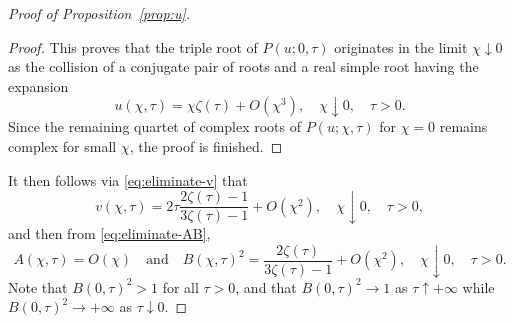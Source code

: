 \begin{proof}[Proof of Proposition~\ref{prop:u}]
\begin{proof}
This proves that the triple root of $P(u;0,\tau)$ originates in the limit $\chi\downarrow 0$ as the collision of a conjugate pair of roots and a real simple root having the expansion
\begin{equation}
u(\chi,\tau)=\chi \zeta(\tau)+O(\chi^3),\quad\chi\downarrow 0,\quad\tau>0.
\end{equation}
Since the remaining quartet of complex roots of $P(u;\chi,\tau)$ for $\chi=0$ remains complex for small $\chi$, the proof is finished.
\end{proof}
It then follows via \eqref{eq:eliminate-v}
that 
\begin{equation}
v(\chi,\tau)=2\tau\frac{2\zeta(\tau)-1}{3\zeta(\tau)-1}+O(\chi^2),\quad\chi\downarrow 0,\quad\tau>0,
\end{equation}
and then from \eqref{eq:eliminate-AB},
\begin{equation}
A(\chi,\tau)=O(\chi)\quad\text{and}\quad B(\chi,\tau)^2=\frac{2\zeta(\tau)}{3\zeta(\tau)-1} + O(\chi^2),\quad\chi\downarrow 0,\quad \tau>0.
\end{equation}
Note that $B(0,\tau)^2>1$ for all $\tau>0$, and that $B(0,\tau)^2\to 1$ as $\tau\uparrow +\infty$ while $B(0,\tau)^2\to +\infty$ as $\tau\downarrow 0$.


\end{proof}
